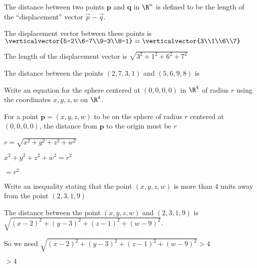 \documentclass{ximera}
\begin{document}
\begin{definition}
  The distance between two points $\mathbf{p}$ and $\mathbf{q}$ in $\R^n$ is defined to be the length of the ``displacement'' vector $\vec{p} - \vec{q}$.
\end{definition}

\begin{question}
  \begin{solution}
    \begin{hint}
      The displacement vector between these points is $\verticalvector{5-2\\6-7\\9-3\\8-1} = \verticalvector{3\\1\\6\\7}$
    \end{hint}
    \begin{hint}
      The length of the displacement vector is $\sqrt{3^2+1^2+6^2+7^2}$
    \end{hint}
    The distance between the points $(2,7,3,1)$ and $(5,6,9,8)$ is 
  \end{solution}
\end{question}

\begin{question}
  Write an equation for the sphere centered at $(0,0,0,0)$ in $\R^4$ of radius $r$ using the coordinates $x,y,z,w$ on $\R^4$.
  \begin{solution}
    \begin{hint}
      For a point $\mathbf{p}=(x,y,z,w)$ to be on the sphere of radius $r$ centered at $(0,0,0,0)$, the distance from $\mathbf{p}$
      to the origin must be $r$
    \end{hint}
    \begin{hint}
      $r = \sqrt{x^2+y^2+z^2+w^2}$
    \end{hint}
    \begin{hint}
      $x^2+y^2+z^2+w^2=r^2$
    \end{hint}
     $= r^2$
  \end{solution}
\end{question}

\begin{question}
  Write an inequality stating that the point $(x,y,z,w)$ is more than $4$ units away from the point $(2,3,1,9)$
  \begin{solution}
    \begin{hint}
      The distance between the point $(x,y,z,w)$ and $(2,3,1,9)$ is $\sqrt{(x-2)^2+(y-3)^2+(z-1)^2+(w-9)^2}$.
    \end{hint}
    \begin{hint}
      So we need $\sqrt{(x-2)^2+(y-3)^2+(z-1)^2+(w-9)^2} > 4$
    \end{hint}
     $>4$ 
  \end{solution}
\end{question}
\end{document}
